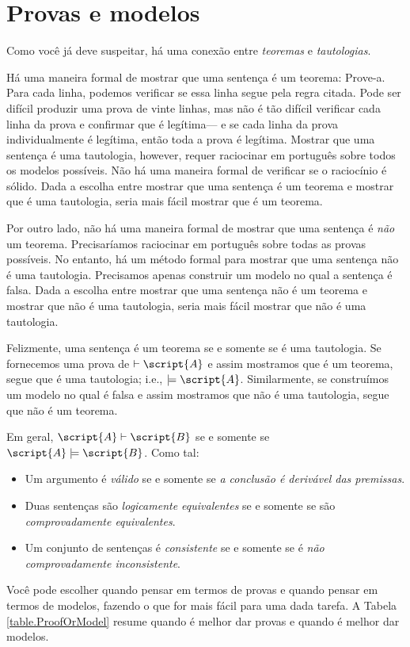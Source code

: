 \section{Provas e modelos}
Como você já deve suspeitar, há uma conexão entre \emph{teoremas} e \emph{tautologias}.

Há uma maneira formal de mostrar que uma sentença é um teorema: Prove-a. Para cada linha, podemos verificar se essa linha segue pela regra citada. Pode ser difícil produzir uma prova de vinte linhas, mas não é tão difícil verificar cada linha da prova e confirmar que é legítima--- e se cada linha da prova individualmente é legítima, então toda a prova é legítima. Mostrar que uma sentença é uma tautologia, however, requer raciocinar em português sobre todos os modelos possíveis. Não há uma maneira formal de verificar se o raciocínio é sólido. Dada a escolha entre mostrar que uma sentença é um teorema e mostrar que é uma tautologia, seria mais fácil mostrar que é um teorema.

Por outro lado, não há uma maneira formal de mostrar que uma sentença é \emph{não} um teorema. Precisaríamos raciocinar em português sobre todas as provas possíveis. No entanto, há um método formal para mostrar que uma sentença não é uma tautologia. Precisamos apenas construir um modelo no qual a sentença é falsa. Dada a escolha entre mostrar que uma sentença não é um teorema e mostrar que não é uma tautologia, seria mais fácil mostrar que não é uma tautologia.

Felizmente, uma sentença é um teorema se e somente se é uma tautologia. Se fornecemos uma prova de $\vdash\script{A}$ e assim mostramos que é um teorema, segue que  é uma tautologia; i.e., $\models\script{A}$. Similarmente, se construímos um modelo no qual  é falsa e assim mostramos que não é uma tautologia, segue que  não é um teorema.

Em geral, $\script{A}\vdash\script{B}$ se e somente se $\script{A}\models\script{B}$. Como tal:
\begin{itemize}
\item Um argumento é \emph{válido} se e somente se \emph{a conclusão é derivável das premissas}.
\item Duas sentenças são \emph{logicamente equivalentes} se e somente se são \emph{comprovadamente equivalentes}.
\item Um conjunto de sentenças é \emph{consistente} se e somente se é \emph{não comprovadamente inconsistente}.
\end{itemize}
Você pode escolher quando pensar em termos de provas e quando pensar em termos de modelos, fazendo o que for mais fácil para uma dada tarefa. A Tabela \ref{table.ProofOrModel} resume quando é melhor dar provas e quando é melhor dar modelos.

